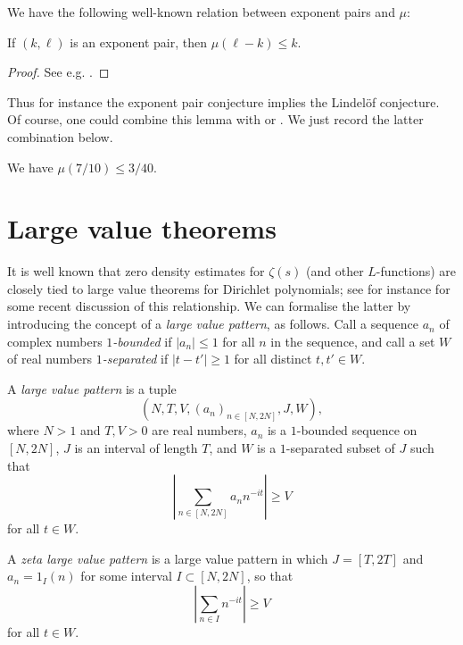 \documentclass[a4paper, 10pt]{amsart}
\begin{document}
We have the following well-known relation between exponent pairs and $\mu$:

\begin{lemma}\label{exp-pair-mu} If $(k,\ell)$ is an exponent pair, then $\mu(\ell-k) \leq k$.
\end{lemma}

\begin{proof} See e.g. \cite[(7.57)]{ivic}.
\end{proof}

Thus for instance the exponent pair conjecture implies the Lindel\"of conjecture.  Of course, one could combine this lemma with  or .  We just record the latter combination below.

\begin{corollary}[Bound on $\mu$]\label{mu-bound}  We have $\mu(7/10) \leq 3/40$.
\end{corollary}

\section{Large value theorems}

It is well known that zero density estimates for $\zeta(s)$ (and other $L$-functions) are closely tied to large value theorems for Dirichlet polynomials; see for instance \cite{matomaki_teravainen_2024} for some recent discussion of this relationship.  We can formalise the latter by introducing the concept of a \emph{large value pattern}, as follows.  Call a sequence $a_n$ of complex numbers \emph{$1$-bounded} if $|a_n| \leq 1$ for all $n$ in the sequence, and call a set $W$ of real numbers \emph{$1$-separated} if $|t-t'| \geq 1$ for all distinct $t,t' \in W$.

\begin{definition}\label{large-pattern-def} A \emph{large value pattern} is a tuple $$(N, T, V, (a_n)_{n \in [N,2N]}, J, W),$$ where $N > 1$ and $T, V > 0$ are real numbers, $a_n$ is a $1$-bounded sequence on $[N,2N]$, $J$ is an interval of length $T$, and $W$ is a $1$-separated subset of $J$ such that
    \begin{equation}\label{V-large}
            \left|\sum_{n \in [N,2N]} a_n n^{-it} \right| \geq V
    \end{equation}
    for all $t \in W$.

    A \emph{zeta large value pattern} is a large value pattern in which $J = [T,2T]$ and $a_n = 1_I(n)$ for some interval $I \subset [N,2N]$, so that
    \begin{equation*}\label{V-large-zeta}
        \left|\sum_{n \in I} n^{-it} \right| \geq V
\end{equation*}
for all $t \in W$.
\end{definition}
\end{document}
